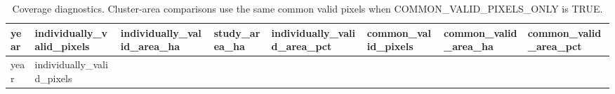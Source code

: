 \documentclass[
]{article}
\begin{document}
\begin{longtable}[]{@{}
  >{\raggedleft\arraybackslash}p{}
  >{\raggedleft\arraybackslash}p{}
  >{\raggedleft\arraybackslash}p{}
  >{\raggedleft\arraybackslash}p{}
  >{\raggedleft\arraybackslash}p{}
  >{\raggedleft\arraybackslash}p{}
  >{\raggedleft\arraybackslash}p{}
  >{\raggedleft\arraybackslash}p{}@{}}
\caption{Coverage diagnostics. Cluster-area comparisons use the same
common valid pixels when COMMON\_VALID\_PIXELS\_ONLY is
TRUE.}\tabularnewline
\toprule\noalign{}
\begin{minipage}[b]{\linewidth}\raggedleft
year
\end{minipage} & \begin{minipage}[b]{\linewidth}\raggedleft
individually\_valid\_pixels
\end{minipage} & \begin{minipage}[b]{\linewidth}\raggedleft
individually\_valid\_area\_ha
\end{minipage} & \begin{minipage}[b]{\linewidth}\raggedleft
study\_area\_ha
\end{minipage} & \begin{minipage}[b]{\linewidth}\raggedleft
individually\_valid\_area\_pct
\end{minipage} & \begin{minipage}[b]{\linewidth}\raggedleft
common\_valid\_pixels
\end{minipage} & \begin{minipage}[b]{\linewidth}\raggedleft
common\_valid\_area\_ha
\end{minipage} & \begin{minipage}[b]{\linewidth}\raggedleft
common\_valid\_area\_pct
\end{minipage} \\
\midrule\noalign{}
\endfirsthead
\toprule\noalign{}
\begin{minipage}[b]{\linewidth}\raggedleft
year
\end{minipage} & \begin{minipage}[b]{\linewidth}\raggedleft
individually\_valid\_pixels
\end{minipage} & \begin{minipage}[b]{\linewidth}\raggedleft

\end{minipage}
\end{longtable}
\end{document}
